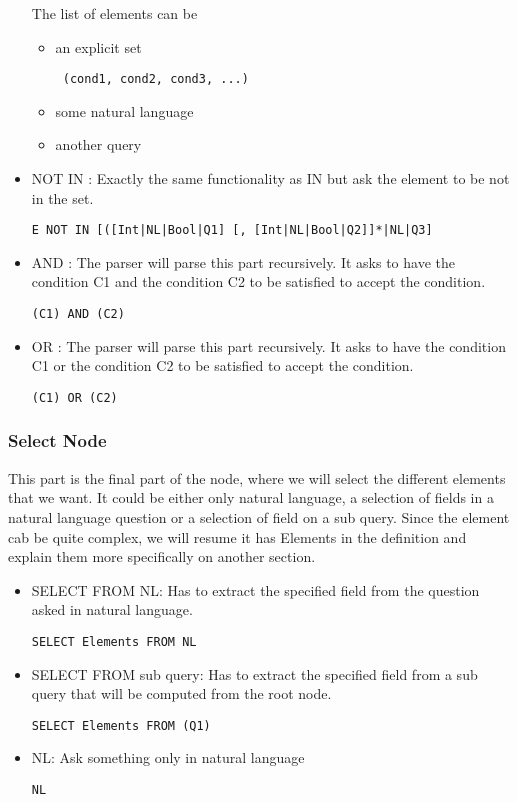 \documentclass{article}
\begin{document}
\begin{itemize}
\begin{verbatim}
\end{verbatim}
The list of elements can be
\begin{itemize}
\item an explicit set
\begin{verbatim}
 (cond1, cond2, cond3, ...)
\end{verbatim}
\item some natural language
\item another query
\end{itemize}
\item NOT IN : Exactly the same functionality as IN but ask the element to be not in the set.
\begin{verbatim}
E NOT IN [([Int|NL|Bool|Q1] [, [Int|NL|Bool|Q2]]*|NL|Q3]
\end{verbatim}
\item AND : The parser will parse this part recursively. It asks to have the condition C1 and the condition C2 to be satisfied to accept the condition.
\begin{verbatim}
(C1) AND (C2)
\end{verbatim}
\item OR : The parser will parse this part recursively. It asks to have the condition C1 or the condition C2 to be satisfied to accept the condition.
\begin{verbatim}
(C1) OR (C2)
\end{verbatim}
\end{itemize}
\subsubsection{Select Node}
This part is the final part of the node, where we will select the different elements that we want. It could be either only natural language, a selection of fields in a natural language question or a selection of field on a sub query.
Since the element cab be quite complex, we will resume it has Elements in the definition and explain them more specifically on another section.
\begin{itemize}
\item SELECT FROM NL: Has to extract the specified field from the question asked in natural language.
\begin{verbatim}
SELECT Elements FROM NL
\end{verbatim}
\item SELECT FROM sub query: Has to extract the specified field from a sub query that will be computed from the root node.
\begin{verbatim}
SELECT Elements FROM (Q1)
\end{verbatim}
\item NL: Ask something only in natural language
\begin{verbatim}
NL
\end{verbatim}
\end{itemize}
\end{document}
